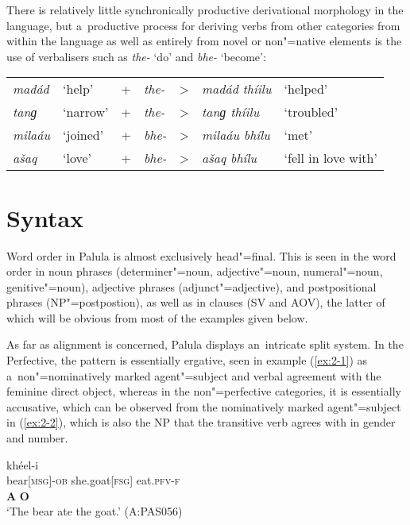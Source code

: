 There is relatively little synchronically productive derivational morphology in the language, but a~productive process for deriving verbs from other categories from within the language as well as entirely from novel or non"=native elements is the use of verbalisers such as \textit{the-} `do' and \textit{bhe-} `become':


\begin{table}[H]
\begin{tabularx}{\textwidth}{ l l l l l l l}
\textit{madád} &
`help' &
+ &
\textit{the-} &
{\textgreater} &
\textit{madád thíilu} &
`helped'\\
\textit{tanɡ} &
`narrow' &
+ &
\textit{the-} &
{\textgreater} &
\textit{tanɡ thíilu} &
`troubled'\\
\textit{milaáu} &
`joined' &
+ &
\textit{bhe-} &
{\textgreater} &
\textit{milaáu bhílu} &
`met'\\
\textit{ašaq} &
`love' &
+ &
\textit{bhe-} &
{\textgreater} &
\textit{ašaq bhílu} &
`fell in love with'\\
\end{tabularx}
\end{table}



\section{Syntax}
\label{sec:2-3}
Word order in Palula is almost exclusively head"=final. This is seen in the word order in noun phrases (determiner"=noun, adjective"=noun, numeral"=noun, genitive"=noun), adjective phrases (adjunct"=adjective), and postpositional phrases (NP"=postpostion), as well as in clauses (SV and AOV), the latter of which will be obvious from most of the examples given below.


As far as alignment is concerned, Palula displays an~intricate split system. In the Perfective, the pattern is essentially ergative, seen in example (\ref{ex:2-1}) as a~non"=nominatively marked agent"=subject and verbal agreement with the feminine direct object, whereas in the non"=perfective categories, it is essentially accusative, which can be observed from the nominatively marked agent"=subject in (\ref{ex:2-2}), which is also the NP that the transitive verb agrees with in gender and number.

\begin{exe}
\ex
\label{ex:2-1}
\glll [íṇc̣-a] [čhéeli] khéel-i \\
bear[\textsc{msg}]-\textsc{ob} she.goat[\textsc{fsg}] eat.\textsc{pfv-}\textsc{f}\\
\textbf{A} \textbf{O} \\
\glt `The bear ate the goat.' (A:PAS056)
\end{exe}

